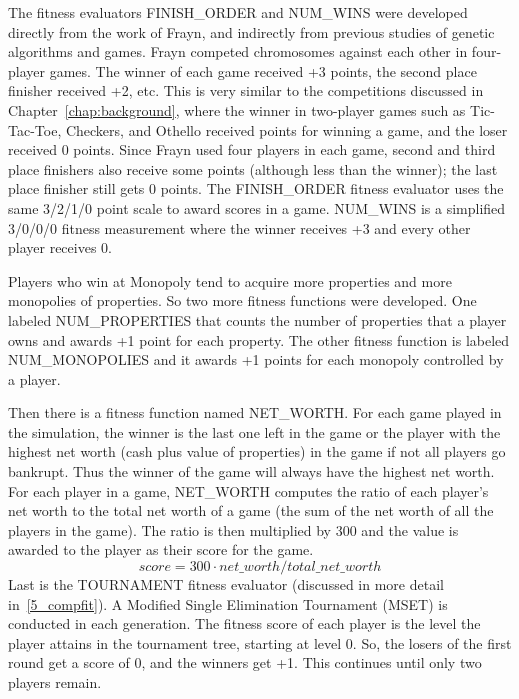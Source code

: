 The fitness evaluators FINISH\_ORDER and NUM\_WINS were developed directly from
the work of Frayn, and indirectly from previous studies of genetic algorithms
and games. Frayn competed chromosomes against each other in four-player games.
The winner of each game received +3 points, the second place finisher received
+2, etc. This is very similar to the competitions discussed in
Chapter~\ref{chap:background}, where the winner in two-player games such as
Tic-Tac-Toe, Checkers, and Othello received points for winning a game, and the
loser received 0 points. Since Frayn used four players in each game, second and
third place finishers also receive some points (although less than the winner);
the last place finisher still gets 0 points. The FINISH\_ORDER fitness evaluator
uses the same 3/2/1/0 point scale to award scores in a game. NUM\_WINS  is a
simplified 3/0/0/0 fitness measurement where the winner receives +3 and every 
other player receives 0.

Players who win at Monopoly tend to acquire more
properties and more monopolies of properties. So two more fitness functions were
developed. One labeled NUM\_PROPERTIES that counts the number of properties that
a player owns and awards +1 point for each property. The other fitness function
is labeled NUM\_MONOPOLIES and it awards +1 points for each monopoly controlled
by a player.

Then there is a fitness function named NET\_WORTH. For each game played in the
simulation, the winner is the last one left in the game or the player with the
highest net worth (cash plus value of properties) in the game if not all players
go bankrupt. Thus the winner of the game will always have the highest net worth.
For each player in a game, NET\_WORTH computes the ratio of each player's net
worth to the total net worth of a game (the sum of the net worth of all the
players in the game). The ratio is then multiplied by 300 and the value is
awarded to the player as their score for the game.
\begin{equation*}
score = 300 \cdot net\_worth / total\_net\_worth
\end{equation*}
Last is the TOURNAMENT fitness evaluator (discussed in more detail
in~\ref{5_compfit}). A Modified Single Elimination Tournament (MSET) is
conducted in each generation. The fitness score of each player is the level the
player attains in the tournament tree, starting at level 0. So, the losers of
the first round get a score of 0, and the winners get +1. This continues until
only two players remain.

